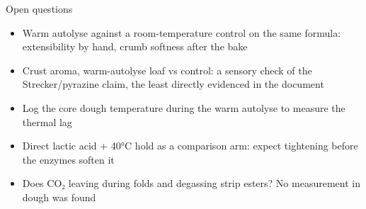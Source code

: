 \documentclass[aspectratio=169,11pt]{beamer}
\begin{document}
\begin{frame}{Open questions}
  \small
  \begin{itemize}\setlength{\itemsep}{0.45em}
    \item Warm autolyse against a room-temperature control on the same
      formula: extensibility by hand, crumb softness after the bake
      \untested
    \item Crust aroma, warm-autolyse loaf vs control: a sensory check of the
      Strecker/pyrazine claim, the least directly evidenced in the document
      \untested
    \item Log the core dough temperature during the warm autolyse to measure
      the thermal lag \untested
    \item Direct lactic acid + 40°C hold as a comparison arm: expect
      tightening before the enzymes soften it \untested
    \item Does CO₂ leaving during folds and degassing strip esters? No
      measurement in dough was found \hypothesis
  \end{itemize}
\end{frame}
\end{document}
